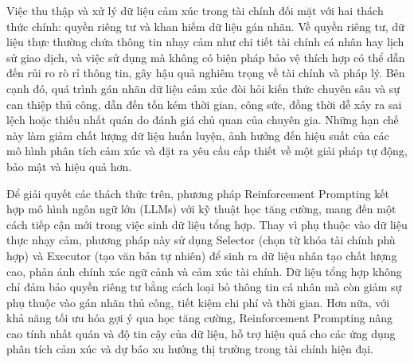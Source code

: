 \documentclass[a4paper,10pt]{article}
\begin{document}
Việc thu thập và xử lý dữ liệu cảm xúc trong tài chính đối mặt với hai thách thức chính: quyền riêng tư và khan hiếm dữ liệu gán nhãn. Về quyền riêng tư, dữ liệu thực thường chứa thông tin nhạy cảm như chi tiết tài chính cá nhân hay lịch sử giao dịch, và việc sử dụng mà không có biện pháp bảo vệ thích hợp có thể dẫn đến rủi ro rò rỉ thông tin, gây hậu quả nghiêm trọng về tài chính và pháp lý. Bên cạnh đó, quá trình gán nhãn dữ liệu cảm xúc đòi hỏi kiến thức chuyên sâu và sự can thiệp thủ công, dẫn đến tốn kém thời gian, công sức, đồng thời dễ xảy ra sai lệch hoặc thiếu nhất quán do đánh giá chủ quan của chuyên gia. Những hạn chế này làm giảm chất lượng dữ liệu huấn luyện, ảnh hưởng đến hiệu suất của các mô hình phân tích cảm xúc và đặt ra yêu cầu cấp thiết về một giải pháp tự động, bảo mật và hiệu quả hơn.

Để giải quyết các thách thức trên, phương pháp Reinforcement Prompting kết hợp mô hình ngôn ngữ lớn (LLMs) với kỹ thuật học tăng cường, mang đến một cách tiếp cận mới trong việc sinh dữ liệu tổng hợp. Thay vì phụ thuộc vào dữ liệu thực nhạy cảm, phương pháp này sử dụng Selector (chọn từ khóa tài chính phù hợp) và Executor (tạo văn bản tự nhiên) để sinh ra dữ liệu nhân tạo chất lượng cao, phản ánh chính xác ngữ cảnh và cảm xúc tài chính. Dữ liệu tổng hợp không chỉ đảm bảo quyền riêng tư bằng cách loại bỏ thông tin cá nhân mà còn giảm sự phụ thuộc vào gán nhãn thủ công, tiết kiệm chi phí và thời gian. Hơn nữa, với khả năng tối ưu hóa gợi ý qua học tăng cường, Reinforcement Prompting nâng cao tính nhất quán và độ tin cậy của dữ liệu, hỗ trợ hiệu quả cho các ứng dụng phân tích cảm xúc và dự báo xu hướng thị trường trong tài chính hiện đại.


\end{document}
